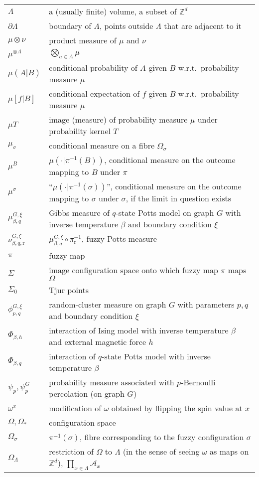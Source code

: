 \documentclass[12pt]{article}
\newcommand{\A}{\mathcal{A}}
\renewcommand{\r}{\mathrm{r}}
\newcommand{\Z}{\mathbb{Z}}
\newcommand{\pika}{\boldsymbol{\cdot}}
\newcommand{\1}{\mathbbm{1}}
\newcommand{\5}{\vspace{0.5cm}}
\theoremstyle{definition}
\begin{document}
\begin{tabular}{p{4cm}p{10cm}}
$\Lambda$ & a (usually finite) volume, a subset of $\Z^d$ \\
$\partial\Lambda$ & boundary of $\Lambda$, points outside $\Lambda$ that are adjacent to it \\
$\mu\otimes\nu$ & product measure of $\mu$ and $\nu$ \\
$\mu^{\otimes A}$ & $\bigotimes_{a\in A}\mu$ \\
$\mu(A|B)$ & conditional probability of $A$ given $B$ w.r.t.~probability measure $\mu$ \\
$\mu[f|B]$ & conditional expectation of $f$ given $B$ w.r.t.~probability measure $\mu$ \\
$\mu T$ & image (measure) of probability measure $\mu$ under probability kernel $T$ \\
$\mu_\sigma$ & conditional measure on a fibre $\Omega_\sigma$ \\
$\mu^B$ & $\mu(\pika|\pi^{-1}(B))$, conditional measure on the outcome mapping to $B$ under $\pi$ \\
$\mu^\sigma$ & ``$\mu(\pika|\pi^{-1}(\sigma))$'', conditional measure on the outcome mapping to $\sigma$ under $\sigma$, if the limit in question exists \\
$\mu_{\beta,q}^{G,\xi}$ & Gibbs measure of $q$-state Potts model on graph $G$ with inverse temperature $\beta$ and boundary condition $\xi$ \\
$\nu_{\beta,q,\r}^{G,\xi}$ & $\mu_{\beta,q}^{G,\xi}\circ\pi_\r^{-1}$, fuzzy Potts measure \\
$\pi$ & fuzzy map \\
$\Sigma$ & image configuration space onto which fuzzy map $\pi$ maps $\Omega$ \\
$\Sigma_0$ & Tjur points \\
$\phi_{p,q}^{G,\xi}$ & random-cluster measure on graph $G$ with parameters $p,q$ and boundary condition $\xi$ \\
$\Phi_{\beta,h}$ & interaction of Ising model with inverse temperature $\beta$ and external magnetic force $h$ \\
$\Phi_{\beta,q}$ & interaction of $q$-state Potts model with inverse temperature $\beta$ \\
$\psi_p,\psi_p^G$ & probability measure associated with $p$-Bernoulli percolation (on graph $G$) \\
$\omega^x$ & modification of $\omega$ obtained by flipping the spin value at $x$ \\ 
$\Omega,\Omega_*$ & configuration space \\
$\Omega_\sigma$ & $\pi^{-1}(\sigma)$, fibre corresponding to the fuzzy configuration $\sigma$ \\
$\Omega_\Lambda$ & restriction of $\Omega$ to $\Lambda$ (in the sense of seeing $\omega$ as maps on $\Z^d$), $\prod_{x\in\Lambda}\A_x$
\end{tabular}
\end{document}
